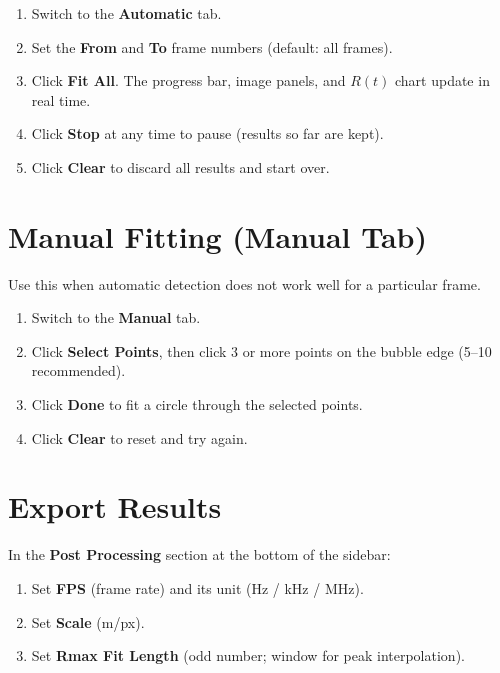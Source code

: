 \documentclass[11pt, letterpaper]{article}
\begin{document}
\begin{enumerate}
    \item Switch to the \textbf{Automatic} tab.
    \item Set the \textbf{From} and \textbf{To} frame numbers (default: all
          frames).
    \item Click \textbf{Fit All}. The progress bar, image panels, and $R(t)$
          chart update in real time.
    \item Click \textbf{Stop} at any time to pause (results so far are kept).
    \item Click \textbf{Clear} to discard all results and start over.
\end{enumerate}


\section{Manual Fitting (Manual Tab)}

Use this when automatic detection does not work well for a particular frame.

\begin{enumerate}
    \item Switch to the \textbf{Manual} tab.
    \item Click \textbf{Select Points}, then click 3 or more points on the
          bubble edge (5--10 recommended).
    \item Click \textbf{Done} to fit a circle through the selected points.
    \item Click \textbf{Clear} to reset and try again.
\end{enumerate}


\section{Export Results}

In the \textbf{Post Processing} section at the bottom of the sidebar:

\begin{enumerate}
    \item Set \textbf{FPS} (frame rate) and its unit (Hz / kHz / MHz).
    \item Set \textbf{Scale} (\textmu m/px).
    \item Set \textbf{Rmax Fit Length} (odd number; window for peak
          interpolation).
\end{enumerate}
\end{document}

